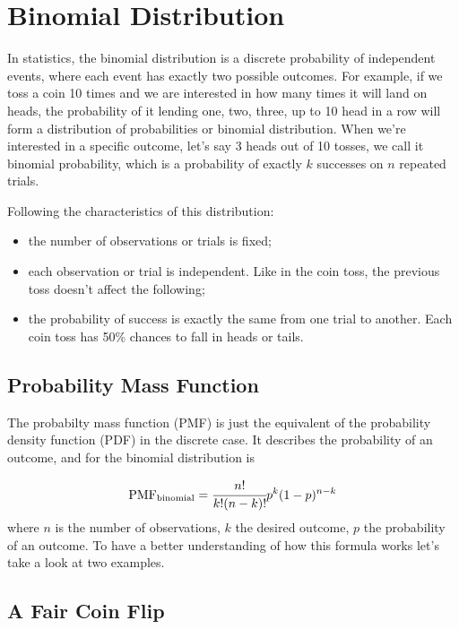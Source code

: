 \chapter{Binomial Distribution}\label{binomial-distribution}

In statistics, the binomial distribution is a discrete probability of
independent events, where each event has exactly two possible outcomes.
For example, if we toss a coin 10 times and we are interested in how
many times it will land on heads, the probability of it lending one,
two, three, up to 10 head in a row will form a distribution of
probabilities or binomial distribution. When we're interested in a
specific outcome, let's say 3 heads out of 10 tosses, we call it
binomial probability, which is a probability of exactly \(k\) successes
on \(n\) repeated trials.

Following the characteristics of this distribution:

\begin{itemize}
\tightlist
\item
  the number of observations or trials is fixed;
\item
  each observation or trial is independent. Like in the coin toss, the
  previous toss doesn't affect the following;
\item
  the probability of success is exactly the same from one trial to
  another. Each coin toss has 50\% chances to fall in heads or tails.
\end{itemize}

\section{Probability Mass Function}\label{probability-mass-function}

The probabilty mass function (PMF) is just the equivalent of the
probability density function (PDF) in the discrete case. It describes the
probability of an outcome, and for the binomial distribution is

\[ \mathrm{PMF}_{\mathrm{binomial}} = \cfrac{n!}{k!(n-k)!}p^k (1-p)^{n-k}\]
where \(n\) is the number of observations, \(k\) the desired outcome,
\(p\) the probability of an outcome. To have a better understanding of
how this formula works let's take a look at two examples.

\section{A Fair Coin Flip}\label{a-fair-coin-flip}


